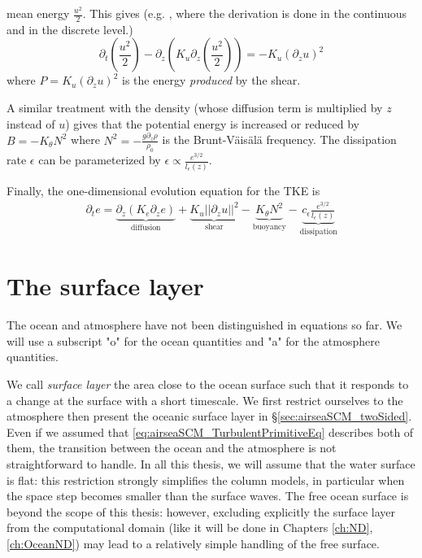 mean energy $\frac{u^2}{2}$.
This gives (e.g. \citep{burchard_energy-conserving_2002},
where the derivation is done in the continuous and in the
discrete level.)
\begin{equation}
	\partial_t (\frac{u^2}{2})
	- \partial_z (K_u \partial_z(\frac{u^2}{2}))
	= - K_u(\partial_z u)^2
\end{equation}
where $P=K_u(\partial_z u)^2$ is the energy
\textit{produced} by the shear.
\par
A similar treatment with the density
(whose diffusion term is multiplied by $z$ instead of $u$)
gives that the potential energy
is increased or reduced by $B = -K_\theta N^2$ where
$N^2 = - \frac{g\partial_z \rho}{\rho_0}$ is the Brunt-Väisälä
frequency.
The dissipation rate $\epsilon$ can be parameterized by
$\epsilon \propto \frac{e^{3/2}}{l_{\epsilon}(z)}$.
\par
Finally, the one-dimensional evolution equation for the TKE is
\begin{equation}
\label{eq:airseaSCM_TKE_evolution}
    \begin{aligned}
    \partial_t e =
    \underbrace{\partial_z \left(K_e
    \partial_z e\right)}_{\text{diffusion}}
    + \underbrace{K_u ||\partial_z u||^2}_{\text{shear}} 
    - \underbrace{K_{\theta} N^2 }_{\text{buoyancy}}
    - \underbrace{c_{\epsilon}
    \frac{e^{3/2}}{l_{\epsilon}(z)}}_{\text{dissipation}}
    \end{aligned}
\end{equation}
\section{The surface layer}
\label{sec:airseaSCM_SL}
The ocean and atmosphere have not been distinguished in equations so far.
We will use a subscript "o" for the ocean quantities and "a" for the
atmosphere quantities.
\par
We call \textit{surface layer} the area close to the ocean surface
such that it responds to a change at the surface with a short
timescale.
We first restrict ourselves to the atmosphere then
present the oceanic surface layer in \S \ref{sec:airseaSCM_twoSided}.
Even if we assumed that \eqref{eq:airseaSCM_TurbulentPrimitiveEq}
describes both of them, the transition between the ocean and the
atmosphere is not straightforward to handle.
In all this thesis, we will assume that the water
surface is flat: this restriction strongly simplifies
the column models, in particular when the space step becomes
smaller than the surface waves.
The free ocean surface is beyond the scope of this thesis:
however, excluding explicitly
the surface layer from the computational
domain (like it will be done in Chapters \ref{ch:ND},
\ref{ch:OceanND}) may lead to
a relatively simple handling of the free surface.
